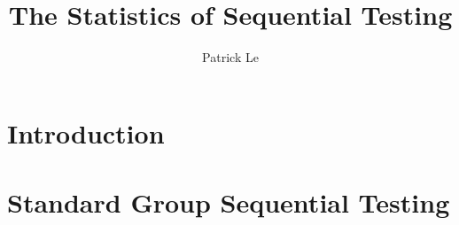 \documentclass[final,3p,times]{elsarticle}
\begin{document}
\begin{frontmatter}



\title{The Statistics of Sequential Testing}


\author{Patrick Le}

\address{}

\begin{abstract}

\end{abstract}

\begin{keyword}


\end{keyword}

\end{frontmatter}



\section{Introduction}


\section{Standard Group Sequential Testing}
\end{document}
